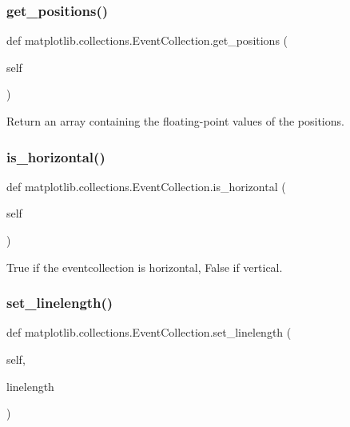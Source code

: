 \subsubsection{\texorpdfstring{get\+\_\+positions()}{get\_positions()}}
{\footnotesize\ttfamily def matplotlib.\+collections.\+Event\+Collection.\+get\+\_\+positions (\begin{DoxyParamCaption}\item[{}]{self }\end{DoxyParamCaption})}

\begin{DoxyVerb}Return an array containing the floating-point values of the positions.
\end{DoxyVerb}
 \mbox{\label{classmatplotlib_1_1collections_1_1EventCollection_a848c9dbf2b2ad7dbcbf83931b3246dfb}} 
\subsubsection{\texorpdfstring{is\+\_\+horizontal()}{is\_horizontal()}}
{\footnotesize\ttfamily def matplotlib.\+collections.\+Event\+Collection.\+is\+\_\+horizontal (\begin{DoxyParamCaption}\item[{}]{self }\end{DoxyParamCaption})}

\begin{DoxyVerb}True if the eventcollection is horizontal, False if vertical.\end{DoxyVerb}
 \mbox{\label{classmatplotlib_1_1collections_1_1EventCollection_a2beaf31284535493cd5f4fc33328b5ad}} 
\subsubsection{\texorpdfstring{set\+\_\+linelength()}{set\_linelength()}}
{\footnotesize\ttfamily def matplotlib.\+collections.\+Event\+Collection.\+set\+\_\+linelength (\begin{DoxyParamCaption}\item[{}]{self,  }\item[{}]{linelength }\end{DoxyParamCaption})}

